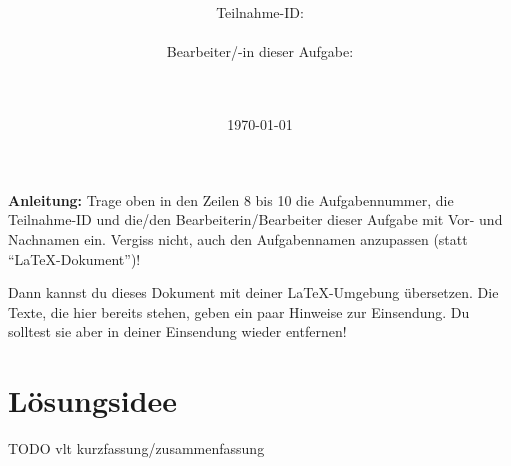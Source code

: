 \documentclass[a4paper,10pt,ngerman]{scrartcl}
\title{\textbf{\Huge\Aufgabe}}
\author{\LARGE Teilnahme-ID: \LARGE \TeilnahmeId \\\\
\LARGE Bearbeiter/-in dieser Aufgabe: \\
\LARGE \Name\\\\}
\date{\LARGE\today}
\begin{document}
    \maketitle
    \tableofcontents

    \vspace{0.5cm}

    \textbf{Anleitung:} Trage oben in den Zeilen 8 bis 10 die Aufgabennummer, die Teilnahme-ID und die/den Bearbeiterin/Bearbeiter dieser Aufgabe mit Vor- und Nachnamen ein.
    Vergiss nicht, auch den Aufgabennamen anzupassen (statt "`\LaTeX-Dokument"')!

    Dann kannst du dieses Dokument mit deiner \LaTeX-Umgebung übersetzen.
    Die Texte, die hier bereits stehen, geben ein paar Hinweise zur
    Einsendung. Du solltest sie aber in deiner Einsendung wieder entfernen!


    \section{Lösungsidee}
    TODO vlt kurzfassung/zusammenfassung
\end{document}
